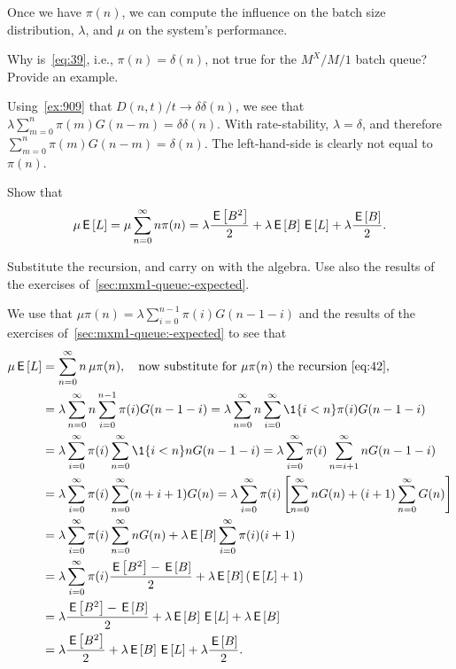Once we have $\pi(n)$, we can compute the influence on the batch size distribution, $\lambda$, and $\mu$ on the system's performance.

\begin{exercise}
 Why is~\cref{eq:39}, i.e., $\pi(n)=\delta(n)$, not true for the $M^X/M/1$ batch queue?
 Provide an example.
\begin{solution}
Using~\cref{ex:909} that $D(n,t)/t \to \delta \delta(n)$, we see that
$\lambda \sum_{m=0}^n \pi(m) G(n-m) = \delta \delta(n)$. With rate-stability, $\lambda=\delta$, and therefore 
$\sum_{m=0}^n \pi(m) G(n-m) = \delta(n)$. The left-hand-side is clearly not equal to $\pi(n)$. 
\end{solution}
\end{exercise}


\begin{extra}
 Show that
\begin{equation}\label{eq:67}
 \mu \,\mathsf{E}\left[L\right] =\mu \sum_{n=0}^\infty n \pi(n) = \lambda \frac{\,\mathsf{E}\left[B^2\right]}2 + \lambda \,\mathsf{E}\left[B\right] \,\mathsf{E}\left[L\right] +\lambda \frac{\,\mathsf{E}\left[B\right]}2.
\end{equation}
\begin{hint}
 Substitute the recursion, and carry on with the algebra.
 Use also the results of the exercises of~\cref{sec:mxm1-queue:-expected}.
\end{hint}
\begin{solution}
 We use that $\mu \pi(n) =\lambda \sum_{i=0}^{n-1} \pi(i) G(n-1-i)$ and the results of the exercises of~\cref{sec:mxm1-queue:-expected} to see that
\begin{align*}
 \mu \E L
 &=\sum_{n=0}^\infty n\, \mu \pi(n), \quad \text{now substitute for $\mu \pi(n)$ the recursion~\cref{eq:42}}, \\
& =\lambda \sum_{n=0}^\infty n \sum_{i=0}^{n-1} \pi(i) G(n-1-i) 
 =\lambda \sum_{n=0}^\infty n \sum_{i=0}^\infty \1{i<n} \pi(i) G(n-1-i) \\
& =\lambda \sum_{i=0}^\infty \pi(i) \sum_{n=0}^\infty \1{i<n} n G(n-1-i) 
 =\lambda \sum_{i=0}^\infty \pi(i) \sum_{n=i+1}^\infty n G(n-1-i) \\
& =\lambda \sum_{i=0}^\infty \pi(i) \sum_{n=0}^\infty (n+i+1) G(n) 
 =\lambda \sum_{i=0}^\infty \pi(i) \left[\sum_{n=0}^\infty n G(n) +(i+1) \sum_{n=0}^\infty G(n)\right] \\
 &=\lambda \sum_{i=0}^\infty \pi(i)\sum_{n=0}^\infty n G(n) +\lambda \E B \sum_{i=0}^\infty \pi(i) (i+1) \\ 
 &=\lambda \sum_{i=0}^\infty \pi(i) \frac{\E{B^2} -\E B}2 + \lambda \E B (\E L +1) \\ 
 &= \lambda \frac{\E{B^2} -\E B}2 + \lambda \E B \E L +\lambda \E B \\
 &= \lambda \frac{\E{B^2} }2 + \lambda \E B \E L +\lambda \frac{\E B}2.
\end{align*}
\end{solution}
\end{extra}

